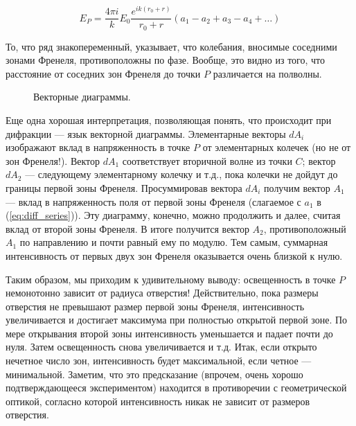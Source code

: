 \documentclass[11pt,a4paper]{article}
\numberwithin{equation}{section}
\begin{document}
\begin{equation} 
\label{eq:diff_series}
E_P = \frac{4 \pi i}{k} E_0 \frac{e^{ik (r_0 +r)}}{r_0 + r} (a_1 - a_2 + a_3 - a_4 + \ldots)
\end{equation}

То, что ряд знакопеременный, указывает, что колебания, вносимые
соседними зонами Френеля, противоположны по фазе. Вообще, это видно из
того, что расстояние от соседних зон Френеля до точки $P$ различается
на полволны.

\begin{figure}[h]
  \centering
  \hspace{2cm}
  \caption{Векторные диаграммы.}
  \label{fig:vector_dia}
\end{figure}

Еще одна хорошая интерпретация, позволяющая понять, что происходит при
дифракции --- язык векторной диаграммы. Элементарные векторы $dA_i$
изображают вклад в напряженность в точке $P$ от элементарных колечек
(но не от зон Френеля!). Вектор $dA_1$ соответствует вторичной волне
из точки $C$; вектор $dA_2$ --- следующему элементарному колечку и
т.д., пока колечки не дойдут до границы первой зоны
Френеля. Просуммировав вектора $dA_i$ получим вектор $A_1$ --- вклад в
напряженность поля от первой зоны Френеля (слагаемое с $a_1$ в
(\ref{eq:diff_series})). Эту диаграмму, конечно, можно продолжить и
далее, считая вклад от второй зоны Френеля. В итоге получится вектор
$A_2$, противоположный $A_1$ по направлению и почти равный ему по
модулю. Тем самым, суммарная интенсивность от первых двух зон Френеля
оказывается очень близкой к нулю.

Таким образом, мы приходим к удивительному выводу: освещенность в
точке $P$ немонотонно зависит от радиуса отверстия! Действительно,
пока размеры отверстия не превышают размер первой зоны Френеля,
интенсивность увеличивается и достигает максимума при полностью
открытой первой зоне. По мере открывания второй зоны интенсивность
уменьшается и падает почти до нуля. Затем освещенность снова
увеличивается и т.д. Итак, если открыто нечетное число зон,
интенсивность будет максимальной, если четное ---
минимальной. Заметим, что это предсказание (впрочем, очень хорошо
подтверждающееся экспериментом) находится в противоречии с
геометрической оптикой, согласно которой интенсивность никак не
зависит от размеров отверстия.
\end{document}
